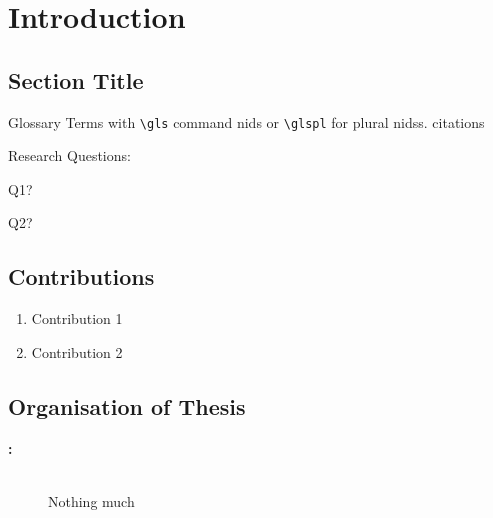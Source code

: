 \chapter{Introduction}
\glsresetall


\section{Section Title}
Glossary Terms with \lstinline{\gls} command \gls{nids} or \lstinline{\glspl} for plural \glspl{nids}.
citations \cite{lecun2015deep}



Research Questions:
\begin{questions}[itemindent=1.5em]
    \item Q1? \label{rq1}
    \item Q2? \label{rq2}
\end{questions}



\section{Contributions}
\begin{enumerate}
    \item Contribution 1
    
    \item Contribution 2
    
    
\end{enumerate}

\section{Organisation of Thesis}

\begin{description}
    

    \item[\textbf{: }] \hfill \\
    Nothing much 
    
\end{description}

